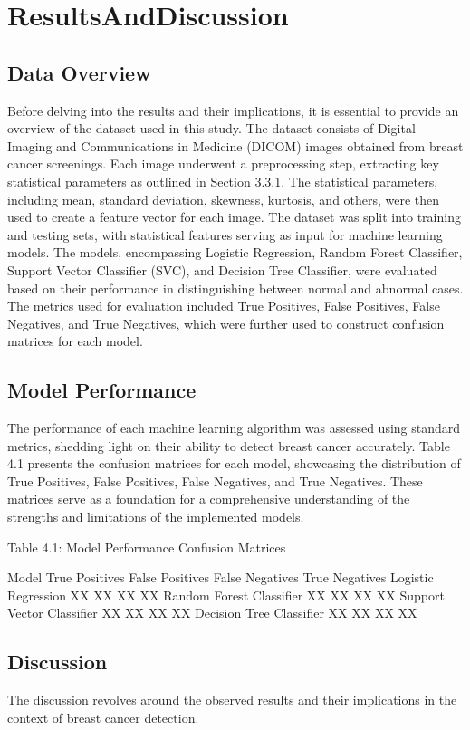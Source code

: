 \chapter{ResultsAndDiscussion}
\label{chap4}
\section{Data Overview}
Before delving into the results and their implications, it is essential to provide an overview of the dataset used in this study. The dataset consists of Digital Imaging and Communications in Medicine (DICOM) images obtained from breast cancer screenings. Each image underwent a preprocessing step, extracting key statistical parameters as outlined in Section 3.3.1. The statistical parameters, including mean, standard deviation, skewness, kurtosis, and others, were then used to create a feature vector for each image.
The dataset was split into training and testing sets, with statistical features serving as input for machine learning models. The models, encompassing Logistic Regression, Random Forest Classifier, Support Vector Classifier (SVC), and Decision Tree Classifier, were evaluated based on their performance in distinguishing between normal and abnormal cases. The metrics used for evaluation included True Positives, False Positives, False Negatives, and True Negatives, which were further used to construct confusion matrices for each model.

\section{Model Performance}
The performance of each machine learning algorithm was assessed using standard metrics, shedding light on their ability to detect breast cancer accurately. Table 4.1 presents the confusion matrices for each model, showcasing the distribution of True Positives, False Positives, False Negatives, and True Negatives. These matrices serve as a foundation for a comprehensive understanding of the strengths and limitations of the implemented models.

Table 4.1: Model Performance Confusion Matrices

Model	True Positives	False Positives	False Negatives	True Negatives
Logistic Regression	XX	XX	XX	XX
Random Forest Classifier	XX	XX	XX	XX
Support Vector Classifier	XX	XX	XX	XX
Decision Tree Classifier	XX	XX	XX	XX

\section{Discussion}
The discussion revolves around the observed results and their implications in the context of breast cancer detection.

